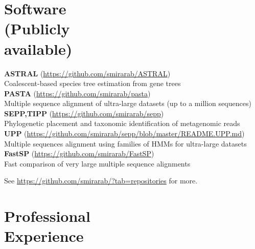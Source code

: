 \documentclass[margin,line,letterpaper]{resume}
\begin{document}
\begin{resume}
\section{\mysidestyle Software\\(Publicly\\available)}
\textbf{ASTRAL} (\url{https://github.com/smirarab/ASTRAL})\\
Coalescent-based species tree estimation from  gene trees\vspace{2mm}\\
\textbf{PASTA} (\url{https://github.com/smirarab/pasta})\\ 
Multiple sequence alignment of ultra-large datasets (up to a million sequences)\vspace{2mm}\\
\textbf{SEPP,TIPP} (\url{https://github.com/smirarab/sepp})\\
Phylogenetic placement and taxonomic identification of metagenomic reads\vspace{2mm}\\
\textbf{UPP} (\url{https://github.com/smirarab/sepp/blob/master/README.UPP.md})\\
Multiple sequences alignment using families of HMMs for ultra-large datasets\vspace{2mm}\\
\textbf{FastSP} (\url{https://github.com/smirarab/FastSP})\\
Fast comparison of very large multiple sequence alignments  

See \url{https://github.com/smirarab/?tab=repositories} for more. 
    \section{\mysidestyle Professional\\Experience}


\end{resume}
\end{document}
